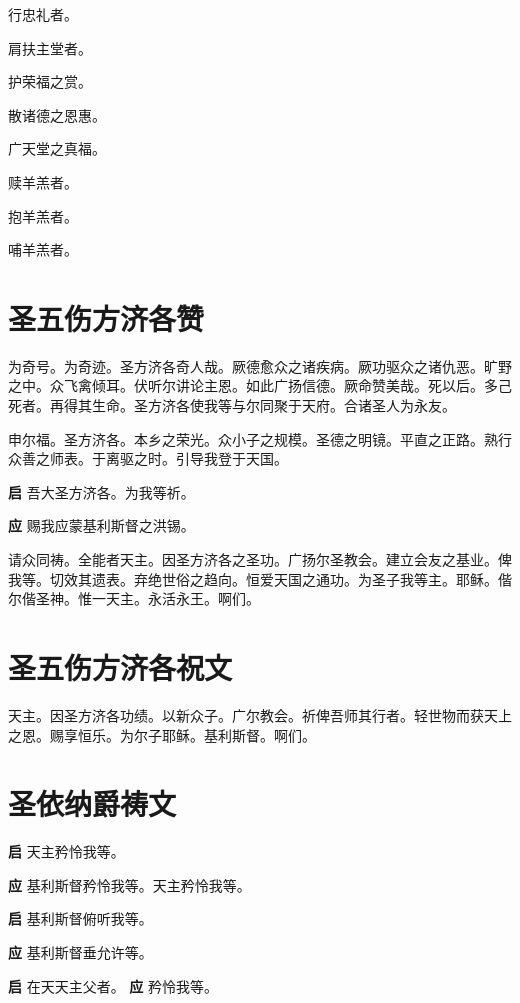 \documentclass[UTF8,17pt]{ctexart}
\begin{document}
 ⾏忠礼者。

 肩扶主堂者。

 护荣福之赏。

 散诸德之恩惠。

 ⼴天堂之真福。

 赎⽺羔者。

 抱⽺羔者。

 哺⽺羔者。

\section{圣五伤⽅济各赞}

为奇号。为奇迹。圣⽅济各奇⼈哉。厥德愈众之诸疾病。厥功驱众之诸仇恶。旷野之中。众飞禽倾⽿。伏听尔讲论主恩。如此⼴扬信德。厥命赞美哉。死以后。多⼰死者。再得其⽣命。圣⽅济各使我等与尔同聚于天府。合诸圣⼈为永友。

申尔福。圣⽅济各。本乡之荣光。众⼩⼦之规模。圣德之明镜。平直之正路。熟⾏众善之师表。于离驱之时。引导我登于天国。

\textbf{启} \quad 吾⼤圣⽅济各。为我等祈。

\textbf{应} \quad 赐我应蒙基利斯督之洪锡。

请众同祷。全能者天主。因圣⽅济各之圣功。⼴扬尔圣教会。建⽴会友之基业。俾我等。切效其遗表。弃绝世俗之趋向。恒爱天国之通功。为圣⼦我等主。耶稣。偕尔偕圣神。惟⼀天主。永活永王。啊们。

\section{圣五伤⽅济各祝⽂}

天主。因圣⽅济各功绩。以新众⼦。⼴尔教会。祈俾吾师其⾏者。轻世物⽽获天上之恩。赐享恒乐。为尔⼦耶稣。基利斯督。啊们。

\section{圣依纳爵祷⽂}

\textbf{启} \quad 天主矜怜我等。

\textbf{应} \quad 基利斯督矜怜我等。天主矜怜我等。

\textbf{启} \quad 基利斯督俯听我等。

\textbf{应} \quad 基利斯督垂允许等。

\textbf{启} \quad 在天天主⽗者。 \hfill \textbf{应} \quad 矜怜我等。
\end{document}
